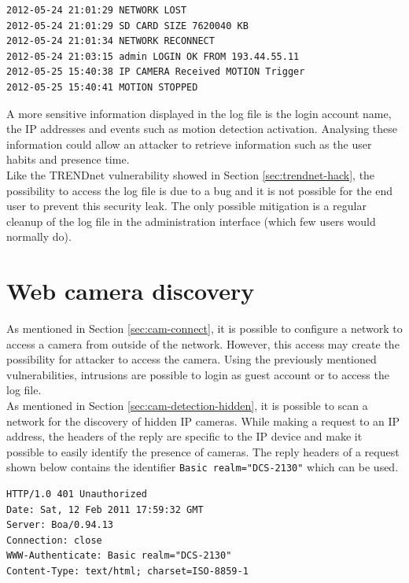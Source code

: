{\scriptsize
\begin{verbatim}
2012-05-24 21:01:29 NETWORK LOST
2012-05-24 21:01:29 SD CARD SIZE 7620040 KB
2012-05-24 21:01:34 NETWORK RECONNECT
2012-05-24 21:03:15 admin LOGIN OK FROM 193.44.55.11
2012-05-25 15:40:38 IP CAMERA Received MOTION Trigger
2012-05-25 15:40:41 MOTION STOPPED
\end{verbatim}
}

A more sensitive information displayed in the log file is the login account name, the IP addresses and events such as motion detection activation.
Analysing these information could allow an attacker to retrieve information such as the user habits and presence time.\\

Like the TRENDnet vulnerability showed in Section \ref{sec:trendnet-hack}, the possibility to access the log file is due to a bug and it is not possible for the end user to prevent this security leak.
The only possible mitigation is a regular cleanup of the log file in the administration interface (which few users would normally do).

\section{Web camera discovery}
\label{sec:dcs-web-access}

As mentioned in Section \ref{sec:cam-connect}, it is possible to configure a network to access a camera from outside of the network.
However, this access may create the possibility for attacker to access the camera.
Using the previously mentioned vulnerabilities, intrusions are possible to login as guest account or to access the log file.\\

As mentioned in Section \ref{sec:cam-detection-hidden}, it is possible to scan a network for the discovery of hidden IP cameras.
While making a request to an IP address, the headers of the reply are specific to the IP device and make it possible to easily identify the presence of cameras.
The reply headers of a request shown below contains the identifier \texttt{Basic realm="DCS-2130"} which can be used.

{\scriptsize
\begin{verbatim}
HTTP/1.0 401 Unauthorized
Date: Sat, 12 Feb 2011 17:59:32 GMT
Server: Boa/0.94.13
Connection: close
WWW-Authenticate: Basic realm="DCS-2130"
Content-Type: text/html; charset=ISO-8859-1
\end{verbatim}
}

